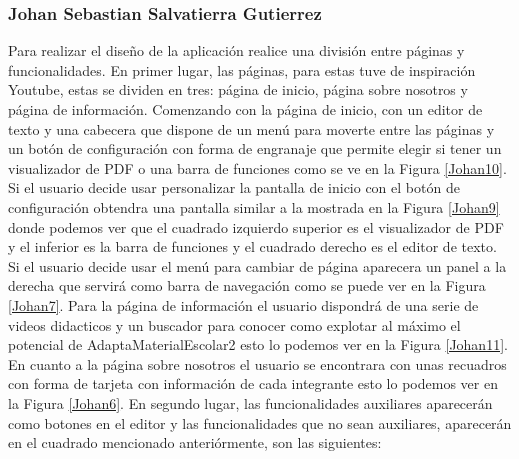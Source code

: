 \subsubsection{Johan Sebastian Salvatierra Gutierrez}
Para realizar el diseño de la aplicación realice una división entre páginas y funcionalidades.
En primer lugar, las páginas, para estas tuve de inspiración Youtube, estas se dividen en tres: página de inicio, página sobre nosotros y página de información. Comenzando con la página de inicio, con un editor de texto y una cabecera que dispone de un menú para moverte entre las páginas y un botón de configuración con forma de engranaje que permite elegir si tener un visualizador de PDF o una barra de funciones como se ve en la Figura \ref{Johan10}. Si el usuario decide usar personalizar la pantalla de inicio con el botón de configuración obtendra una pantalla similar a la mostrada en la Figura \ref{Johan9} donde podemos ver que el cuadrado izquierdo superior es el visualizador de PDF y el inferior es la barra de funciones y el cuadrado derecho es el editor de texto. Si el usuario decide usar el menú para cambiar de página aparecera un panel a la derecha que servirá como barra de navegación como se puede ver en la Figura \ref{Johan7}. Para la página de información el usuario dispondrá de una serie de videos didacticos y un buscador para conocer como explotar al máximo el potencial de AdaptaMaterialEscolar2 esto lo podemos ver en la Figura \ref{Johan11}. En cuanto a la página sobre nosotros el usuario se encontrara con unas recuadros con forma de tarjeta con información de cada integrante esto lo podemos ver en la Figura \ref{Johan6}.
En segundo lugar, las funcionalidades auxiliares aparecerán  como botones en el editor y las funcionalidades que no sean auxiliares, aparecerán en el cuadrado mencionado anteriórmente, son las siguientes:
